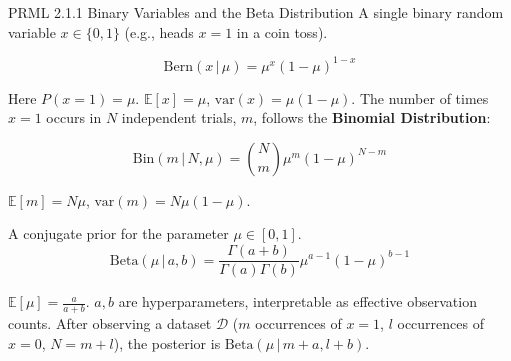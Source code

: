 \documentclass{beamer} %
\newcommand{\given}{\,|\,}
\begin{document}
\begin{frame}{PRML 2.1.1 Binary Variables and the Beta Distribution}
  A single binary random variable $x \in \{0, 1\}$ (e.g., heads $x=1$ in a coin toss).
  \begin{dfn}
  \begin{equation*}
    \text{Bern}(x \given \mu) = \mu^x (1-\mu)^{1-x}
  \end{equation*}
  \end{dfn}
  Here $P(x=1) = \mu$. $\mathbb{E}[x] = \mu$, $\text{var}(x) = \mu(1-\mu)$.
  \vspace{0.5em}
  The number of times $x=1$ occurs in $N$ independent trials, $m$, follows the \textbf{Binomial Distribution}:
  \begin{dfn}
  \begin{equation*}
    \text{Bin}(m \given N,\mu) = \binom{N}{m} \mu^m (1-\mu)^{N-m}
  \end{equation*}
  \end{dfn}
  $\mathbb{E}[m] = N\mu$, $\text{var}(m) = N\mu(1-\mu)$.
  \vspace{0.5em}
  \begin{dfn} A conjugate prior for the parameter $\mu \in [0,1]$.
  \begin{equation*}
    \text{Beta}(\mu \given a,b) = \frac{\Gamma(a+b)}{\Gamma(a)\Gamma(b)} \mu^{a-1} (1-\mu)^{b-1}
  \end{equation*}
  \end{dfn}
  $\mathbb{E}[\mu] = \frac{a}{a+b}$. $a, b$ are hyperparameters, interpretable as effective observation counts.
  After observing a dataset $\mathcal{D}$ ($m$ occurrences of $x=1$, $l$ occurrences of $x=0$, $N=m+l$), the posterior is $\text{Beta}(\mu \given m+a, l+b)$.
\end{frame}
\end{document}
